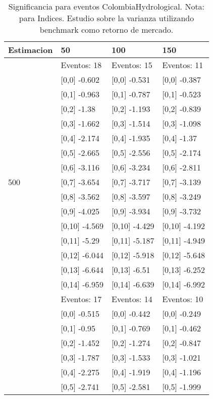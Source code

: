 \begin{table}

\caption{Significancia para eventos ColombiaHydrological. Nota: para Indices. Estudio sobre la varianza utilizando benchmark como retorno de mercado.}
\centering
\begin{tabular}[t]{llll}
\toprule
Estimacion & 50 & 100 & 150\\
\midrule
 & Eventos:  18 & Eventos:  15 & Eventos:  11\\
 & {}[0,0] -0.602 & {}[0,0] -0.531 & {}[0,0] -0.387\\
 & {}[0,1] -0.963 & {}[0,1] -0.787 & {}[0,1] -0.523\\
 & {}[0,2] -1.38 & {}[0,2] -1.193 & {}[0,2] -0.839\\
 & {}[0,3] -1.662 & {}[0,3] -1.514 & {}[0,3] -1.098\\
\addlinespace
 & {}[0,4] -2.174 & {}[0,4] -1.935 & {}[0,4] -1.37\\
 & {}[0,5] -2.665 & {}[0,5] -2.556 & {}[0,5] -2.174\\
 & {}[0,6] -3.116 & {}[0,6] -3.234 & {}[0,6] -2.811\\
500 & {}[0,7] -3.654 & {}[0,7] -3.717 & {}[0,7] -3.139\\
 & {}[0,8] -3.562 & {}[0,8] -3.597 & {}[0,8] -3.249\\
\addlinespace
 & {}[0,9] -4.025 & {}[0,9] -3.934 & {}[0,9] -3.732\\
 & {}[0,10] -4.569 & {}[0,10] -4.429 & {}[0,10] -4.192\\
 & {}[0,11] -5.29 & {}[0,11] -5.187 & {}[0,11] -4.949\\
 & {}[0,12] -6.044 & {}[0,12] -5.918 & {}[0,12] -5.648\\
 & {}[0,13] -6.644 & {}[0,13] -6.51 & {}[0,13] -6.252\\
\addlinespace
 & {}[0,14] -6.959 & {}[0,14] -6.639 & {}[0,14] -6.992\\
 & Eventos:  17 & Eventos:  14 & Eventos:  10\\
 & {}[0,0] -0.515 & {}[0,0] -0.442 & {}[0,0] -0.249\\
 & {}[0,1] -0.95 & {}[0,1] -0.769 & {}[0,1] -0.462\\
 & {}[0,2] -1.452 & {}[0,2] -1.274 & {}[0,2] -0.847\\
\addlinespace
 & {}[0,3] -1.787 & {}[0,3] -1.533 & {}[0,3] -1.021\\
 & {}[0,4] -2.275 & {}[0,4] -1.919 & {}[0,4] -1.196\\
 & {}[0,5] -2.741 & {}[0,5] -2.581 & {}[0,5] -1.999\\

\end{tabular}
\end{table}
